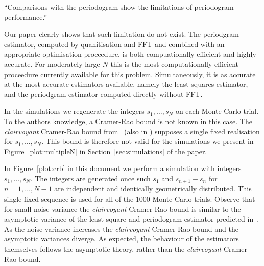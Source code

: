 \documentclass[a4paper,10pt]{article}
\begin{document}
\begin{enumerate}
``Comparisons with the periodogram show the limitations of periodogram performance.''

Our paper clearly shows that such limitation do not exist.  The periodgram estimator, computed by quanitisation and FFT and combined with an appropriate optimisation proceedure, is both compuationally efficient and highly accurate.  For moderately large $N$ this is the most computationally efficient proceedure currently available for this problem.  Simultaneously, it is as accurate at the most accurate estimators available, namely the least squares estimator, and the periodgram estimator computed directly without FFT.

In the simulations we regenerate the integers $s_1,\dots,s_N$ on each Monte-Carlo trial. To the authors knowledge, a Cramer-Rao bound is not known in this case.   The \emph{clairvoyant} Cramer-Rao bound from~\cite{Sidiropoulos2005} (also in \cite{726812,Clarkson2007}) supposes a single fixed realisation for $s_1,\dots,s_N$.  This bound is therefore not valid for the simulations we present in Figure~\ref{plot:multipleN} in Section~\ref{sec:simulations} of the paper.  

In Figure~\ref{plot:crb} in this document we perform a simulation with integers $s_1,\dots,s_N$. The integers are generated once such $s_1$ and $s_{n+1} - s_n$ for $n=1,\dots,N-1$ are independent and identically geometrically distributed.  This single fixed sequence is used for all of the $1000$ Monte-Carlo trials.  Observe that for small noise variance the \emph{clairvoyant} Cramer-Rao bound is similar to the asymptotic variance of the least square and periodogram estimator predicted in~\cite{Quinn_sparse_noisy_SSP_2012,Quinn20013asilomar_period_est}.  As the noise variance increases the \emph{clairvoyant} Cramer-Rao bound and the asymptotic variances diverge.  As expected, the behaviour of the estimators themselves follows the asymptotic theory, rather than the \emph{clairvoyant} Cramer-Rao bound.




\end{enumerate}
\end{document}
